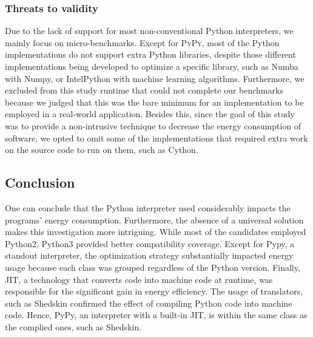 \subsubsection{Threats to validity}
Due to the lack of support for most non-conventional Python interpreters, we mainly focus on micro-benchmarks.
Except for \textsc{PyPy}, most of the Python implementations do not support extra Python libraries, despite those different implementations being developed to optimize a specific library, such as \textsf{Numba} with \textsf{Numpy}, or \textsf{IntelPython} with machine learning algorithms.
Furthermore, we excluded from this study runtime that could not complete our benchmarks because we judged that this was the bare minimum for an implementation to be employed in a real-world application.
Besides this, since the goal of this study was to provide a non-intrusive technique to decrease the energy consumption of software, we opted to omit some of the implementations that required extra work on the source code to run on them, such as \textsf{Cython}.

\subsection{Conclusion}
One can conclude that the Python interpreter used considerably impacts the programs' energy consumption.
Furthermore, the absence of a universal solution makes this investigation more intriguing.
While most of the candidates employed \textsf{Python2}, \textsf{Python3} provided better compatibility coverage.
Except for \textsf{Pypy}, a standout interpreter, the optimization strategy substantially impacted energy usage because each class was grouped regardless of the Python version.
Finally, JIT, a technology that converts code into machine code at runtime, was responsible for the significant gain in energy efficiency.
The usage of translators, such as \textsf{Shedskin} confirmed the effect of compiling Python code into machine code. Hence, \textsf{PyPy}, an interpreter with a built-in JIT, is within the same class as the complied ones, such as \textsf{Shedskin}.
